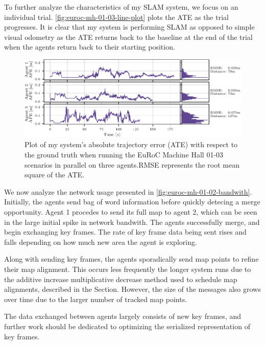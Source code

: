 To further analyze the characteristics of my SLAM system, we focus on an individual trial. \autoref{fig:euroc-mh-01-03-line-plot} plots the ATE as the trial progresses. It is clear that my system is performing SLAM as opposed to simple visual odometry as the ATE returns back to the baseline at the end of the trial when the agents return back to their starting position.

\begin{figure}[h]
    \centering
    \includegraphics[width=\linewidth]{figures/EuRoC_MH_01-03_line_plot.pdf}

    \caption{Plot of my system's absolute trajectory error (ATE) with respect to the ground truth when running the EuRoC Machine Hall 01-03 scenarios in parallel on three agents.\captionbreak RMSE represents the root mean square of the ATE.}
    \label{fig:euroc-mh-01-03-line-plot}
\end{figure}

We now analyze the network usage presented in \autoref{fig:euroc-mh-01-02-bandwith}. Initially, the agents send bag of word information before quickly detecing a merge opportunity. Agent 1 procedes to send its full map to agent 2, which can be seen in the large initial spike in network bandwith. The agents successfully merge, and begin exchanging key frames. The rate of key frame data being sent rises and falls depending on how much new area the agent is exploring.

Along with sending key frames, the agents sporadically send map points to refine their map alignment. This occurs less frequently the longer system runs due to the additive increase multiplicative decrease method used to schedule map alignments, described in the  Section. However, the size of the messages also grows over time due to the larger number of tracked map points.

The data exchanged between agents largely consists of new key frames, and further work should be dedicated to optimizing the serialized representation of key frames.

